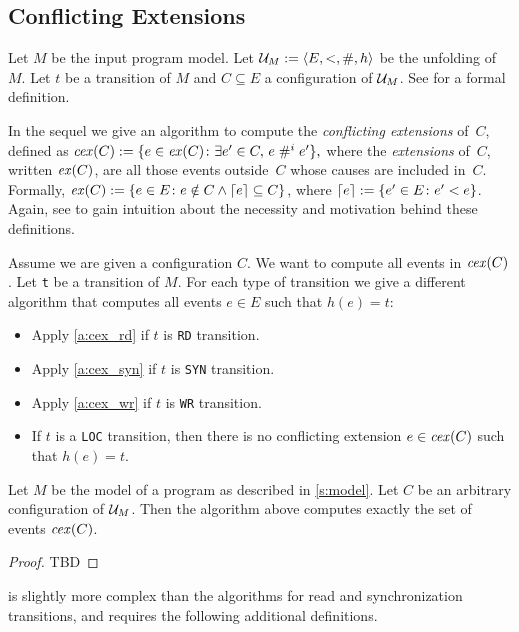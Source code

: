 \documentclass{llncs}
\begin{document}
\subsection{Conflicting Extensions}


Let $M$ be the input program model.
Let $\mathcal{U}_{M} \mathrel{:=} \langle E,<,\mathrel{\#},h\rangle$ be the unfolding of $M$.
Let $t$ be a transition of $M$ and $C \subseteq E$ a configuration of $\mathcal{U}_{M}$.
See \cite{RSSK15} for a formal definition.

In the sequel we give an algorithm to compute the \emph{conflicting extensions}
of~$C$, defined as
$
\mathop{\mathit{cex}} (C) \mathrel{:=}
{\{ e \in \mathop{\mathit{ex}} (C) \colon \exists e' \in C,\, e \mathrel{\#^i_{}}{} e' \mathclose \}},
$
where the \emph{extensions} of~$C$, written $\mathop{\mathit{ex}} (C)$,
are all those events outside~$C$ whose causes are included in~$C$.
Formally,
$
\mathop{\mathit{ex}} (C) \mathrel{:=}
{\{ e \in E \colon e \notin C \land \left \lceil e \right \rceil \subseteq C \mathclose \}}
$, where
$\left \lceil e \right \rceil \mathrel{:=} {\{ e' \in E \colon e' < e \mathclose \}}$.
Again, see \cite{RSSK15long} to gain intuition about the necessity and motivation
behind these definitions.

Assume we are given a configuration $C$.
We want to compute all events in $\mathop{\mathit{cex}} (C)$.
Let \verb!t! be a transition of $M$.
For each type of transition we give a different algorithm that computes all
events $e \in E$ such that $h(e) = t$:
\begin{itemize}
\item Apply \cref{a:cex_rd} if $t$ is \verb!RD! transition.
\item Apply \cref{a:cex_syn} if $t$ is \verb!SYN! transition.
\item Apply \cref{a:cex_wr} if $t$ is \verb!WR! transition.
\item If $t$ is a \verb!LOC! transition, then there is no conflicting extension
$e \in \mathop{\mathit{cex}} (C)$ such that $h(e) = t$.
\end{itemize}

\begin{theorem}
Let $M$ be the model of a program as described in \cref{s:model}.
Let $C$ be an arbitrary configuration of $\mathcal{U}_{M}$.
Then the algorithm above computes exactly the set of events $\mathop{\mathit{cex}} (C)$.
\end{theorem}
\begin{proof}
TBD
\end{proof}

 is slightly more complex than the algorithms for read and
synchronization transitions, and requires the following additional definitions.
\end{document}
